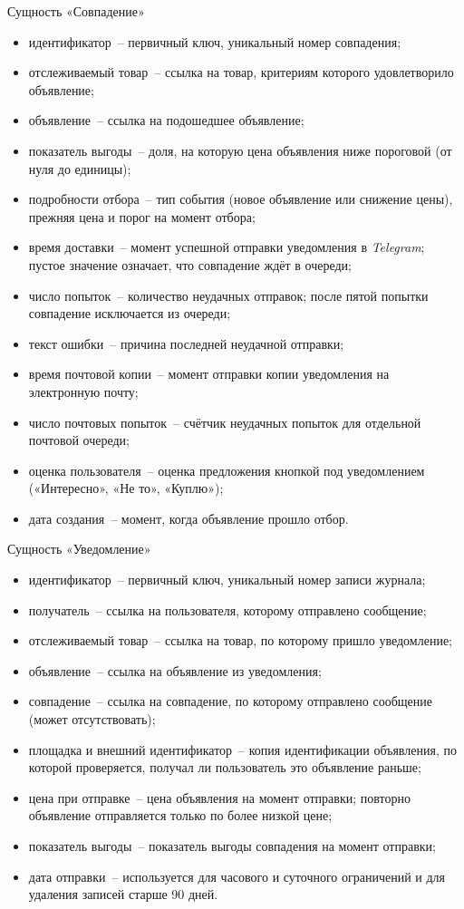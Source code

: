 Сущность «Совпадение»
\begin{itemize}
	\item идентификатор~-- первичный ключ, уникальный номер совпадения;
	\item отслеживаемый товар~-- ссылка на товар, критериям которого удовлетворило объявление;
	\item объявление~-- ссылка на подошедшее объявление;
	\item показатель выгоды~-- доля, на которую цена объявления ниже пороговой (от нуля до единицы);
	\item подробности отбора~-- тип события (новое объявление или снижение цены), прежняя цена и порог на момент отбора;
	\item время доставки~-- момент успешной отправки уведомления в \textit{Telegram}; пустое значение означает, что совпадение ждёт в очереди;
	\item число попыток~-- количество неудачных отправок; после пятой попытки совпадение исключается из очереди;
	\item текст ошибки~-- причина последней неудачной отправки;
	\item время почтовой копии~-- момент отправки копии уведомления на электронную почту;
	\item число почтовых попыток~-- счётчик неудачных попыток для отдельной почтовой очереди;
	\item оценка пользователя~-- оценка предложения кнопкой под уведомлением («Интересно», «Не то», «Куплю»);
	\item дата создания~-- момент, когда объявление прошло отбор.
\end{itemize}

Сущность «Уведомление»
\begin{itemize}
	\item идентификатор~-- первичный ключ, уникальный номер записи журнала;
	\item получатель~-- ссылка на пользователя, которому отправлено сообщение;
	\item отслеживаемый товар~-- ссылка на товар, по которому пришло уведомление;
	\item объявление~-- ссылка на объявление из уведомления;
	\item совпадение~-- ссылка на совпадение, по которому отправлено сообщение (может отсутствовать);
	\item площадка и внешний идентификатор~-- копия идентификации объявления, по которой проверяется, получал ли пользователь это объявление раньше;
	\item цена при отправке~-- цена объявления на момент отправки; повторно объявление отправляется только по более низкой цене;
	\item показатель выгоды~-- показатель выгоды совпадения на момент отправки;
	\item дата отправки~-- используется для часового и суточного ограничений и для удаления записей старше 90 дней.
\end{itemize}

